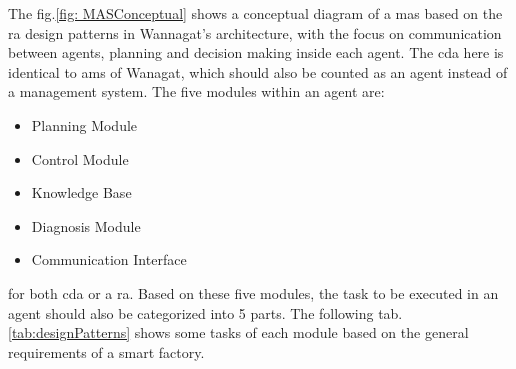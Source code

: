 The fig.\ref{fig: MASConceptual} shows a conceptual diagram of a \gls{mas} based on the \gls{ra} design patterns in Wannagat’s architecture, with the focus on communication between agents, planning and decision making inside each agent. The \gls{cda} here is identical to \gls{ams} of Wanagat, which should also be counted as an agent instead of a management system. The five modules within an agent are: 
\begin{itemize}
    \item Planning Module
    \item Control Module
    \item Knowledge Base
    \item Diagnosis Module
    \item Communication Interface
\end{itemize}

for both \gls{cda} or a \gls{ra}.
Based on these five modules, the task to be executed in an agent should also be categorized into 5 parts. The following tab.\ref{tab:designPatterns} shows some tasks of each module based on the general requirements of a smart factory.



